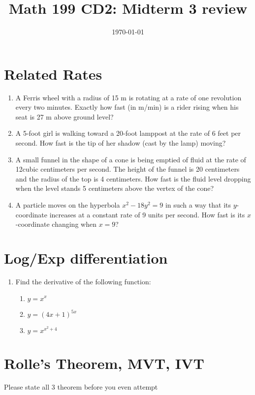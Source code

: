 \documentclass[12pt]{article}
\title{Math 199 CD2: Midterm 3 review}
\date{\today}
\begin{document}
	
	\maketitle
	\section{Related Rates}
	\begin{enumerate}
		\item A Ferris wheel with a radius of 15 m is rotating at a rate of one revolution every two minutes. Exactly how fast (in m/min) is a rider rising when his seat is 27 m above ground level?
		\vskip 4cm
		
		\item A 5-foot girl is walking toward a 20-foot lamppost at the rate of 6 feet per second. How fast is the tip of her shadow (cast by the lamp) moving?
		\vskip 5cm
		\newpage
		\item A small funnel in the shape of a cone is being emptied of fluid at the rate of 12cubic centimeters per second. The height of the funnel is 20 centimeters and the radius of the top is 4 centimeters. How fast is the fluid level dropping when the level stands 5 centimeters above the vertex of the cone?
		\vskip 7cm
		\item A particle moves on the hyperbola $x^2 - 18y^2 = 9$ in such a way that its $y$-coordinate increases at a constant rate of 9 units per second. How fast is its $x$-coordinate changing when $x = 9$?
		\vskip3cm
	\end{enumerate}
	\section{Log/Exp differentiation}
	\begin{enumerate}
	
		\item Find the derivative of the following function:
		\begin{enumerate}
			\item $y=x^x$\vskip 3cm
			\item $y=(4x+1)^{5x}$\vskip 3cm
			\item $y=x^{x^2+4}$\vskip 3cm
		\end{enumerate}
	\end{enumerate}
	\section{Rolle's Theorem, MVT, IVT}
	Please state all 3 theorem before you even attempt\\
	
\end{document}
